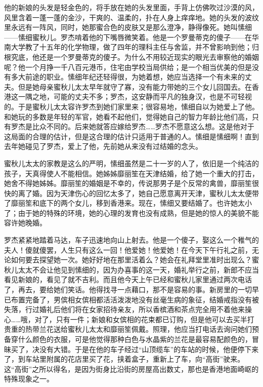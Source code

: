 \par 他的新娘的头发是轻金色的，将手放在她的头发里面，手背上仿佛吹过沙漠的风，风里含着一蓬一蓬的金沙，干爽的、温柔的，扑在人身上痒痒地。她的头发的波纹里永远有一阵风，同时，她那蜜合色的皮肤又是那么澄净，静得像死。她叫愫细——愫细蜜秋儿。罗杰啃着他的下嘴唇微笑着。他是一个罗曼蒂克的傻子——在华南大学教了十五年的化学物理，做了四年的理科主任与舍监，并不曾影响到他；归根究底，他还是一个罗曼蒂克的傻子。为什么不用较近现实的眼光去审察他的婚姻呢？他一个月挣一千八百元港币，住宅由学校当局供给；是一个相当优美的但是没有多大前途的职业。愫细年纪还轻得很，为她着想，她应当选择一个有未来的丈夫。但是她母亲蜜秋儿太太早年就守了寡，没有能力带她的三个女儿回国去。在香港这一隅之地，可能的丈夫不多；罗杰，这安静而平凡的独身汉，也是不可轻视的。于是蜜秋儿太太容许罗杰到她们家里来；很容易地，愫细自以为她爱上了他。和她玩的多数是年轻的军官，她看不起他们，觉得她自己的智力年龄比他们高，只有罗杰是比众不同的。后来她就答应嫁给罗杰……罗杰不愿意这么想。这是他对于这局面的合理的估计，但是这合理的估计只适用于普通的人。愫细是愫细啊！直到去年她碰见了罗杰，爱上了他，先前她从来没有过结婚的念头。
\par 蜜秋儿太太的家教是这么的严明，愫细虽然是二十一岁的人了，依旧是一个纯洁的孩子，天真得使人不能相信。她姊姊靡丽笙在天津结婚，给了她一个重大的打击，她舍不得她姊姊。靡丽笙的婚姻是不幸的，传说那男子是个反常的禽兽，靡丽笙很快的离了婚。因为天津伤心的回忆太多了，她自己愿意离开天津，蜜秋儿太太便带了靡丽笙和底下的两个女儿，移到香港来。现在，愫细又要结婚了。也许她太小了；由于她的特殊的环境，她的心理的发育也没有成熟，但是她的惊人的美貌不能容许她晚婚。
\par 罗杰紧紧地踏着马达，车子迅速地向山上射去。他是一个傻子，娶这么一个稚气的夫人！傻就傻罢，人生只有这么一回！他爱她！他爱她！在今天下午行礼之前，无论如何要去探望她一次。她好好地在那里活着么？她会在礼拜堂里准时出现么？蜜秋儿太太不会让他见到愫细的，因为办喜事的这一天，婚礼举行之前，新郎不应当看见新娘的，看见了就不吉利。而且他今天上午已经和蜜秋儿家里通过两次电话了，再去，要给她们笑话。他得找寻一点藉口，那不是容易的事。新房里的一切早已布置完备了，男傧相女傧相都活活泼泼地没有丝毫生病的象征，结婚戒指没有被失落，行过婚礼后他们将在女家招待亲友，所以香槟酒和茶点完全用不着他来操心……哦，对了，只有一件；新娘和女傧相的花束都已订购，但是他可以去买半打贵重的热带兰花送给蜜秋儿太太和靡丽笙佩戴。照理，他应当打电话去询问她们预备穿什么颜色的衣服，可是他觉得那种白色与水晶紫的兰花是最容易配颜色的，冒昧买了，决没有大错。于是在他的车子经过“山顶缆车”的车站的时候，他便停下来了，到车站里附属的花店里买了花，挟着盒子，重新上了车，向“高街”驶来。这“高街”之所以得名，是因为街身比沿街的房屋高出数丈，那也是香港地面崎岖的特殊现象之一。
